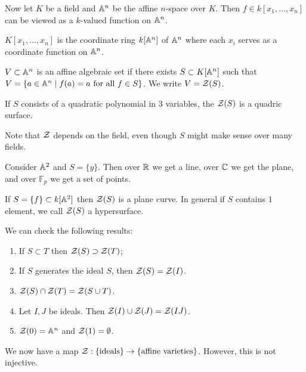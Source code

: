 \message{ !name(notes.tex)}\documentclass[10pt, twoside]{article}
\newcommand{\F}{\mathbb{F}}
\begin{document}
        Now let $K$ be a field and $\mathbb{A}^n$ be the affine $n$-space over $K$. Then $f \in k[x_1, \ldots, x_n]$ can be viewed as a $k$-valued function on $\mathbb{A}^n$.
        \begin{defn}
            $K[x_1, \ldots, x_n]$ is the coordinate ring $k[\mathbb{A}^n]$ of $\mathbb{A}^n$ where each $x_i$ serves as a coordinate function on $\mathbb{A}^n$.
        \end{defn}

        \begin{defn}
            $V \subset \mathbb{A}^n$ is an affine algebraic set if there exists $S \subset K[\mathbb{A}^n]$ such that $V = \{a \in \mathbb{A}^n \mid f(a) = a \text{ for all } f \in S \}$. We write $V = \mathcal{Z}(S)$.
        \end{defn}

        \begin{exm}
            If $S$ consists of a quadratic polynomial in $3$ variables, the $\mathcal{Z}(S)$ is a quadric surface.
        \end{exm}

        Note that $\mathcal{Z}$ depends on the field, even though $S$ might make sense over many fields.
        \begin{exm}
            Consider $\mathbb{A}^2$ and $S = \{y\}$. Then over $\mathbb{R}$ we get a line, over $\mathbb{C}$ we get the plane, and over $\F_p$ we get a set of points.
        \end{exm}

        \begin{exm}
            If $S = \{f\} \subset k[\mathbb{A}^2]$ then $\mathcal{Z}(S)$ is a plane curve. In general if $S$ contains $1$ element, we call $\mathcal{Z}(S)$ a hypersurface.
        \end{exm}

        We can check the following results:
        \begin{enumerate}
            \item If $S \subset T$ then $\mathcal{Z}(S) \supset \mathcal{Z}(T)$;
            \item If $S$ generates the ideal $S$, then $\mathcal{Z}(S) = \mathcal{Z}(I)$.
            \item $\mathcal{Z}(S) \cap \mathcal{Z}(T) = \mathcal{Z}(S \cup T)$.
            \item Let $I,J$ be ideals. Then $\mathcal{Z}(I) \cup \mathcal{Z}(J) = \mathcal{Z}(IJ)$.
            \item $\mathcal{Z}(0) = \mathbb{A}^n$ and $\mathcal{Z}(1) = \emptyset$.
        \end{enumerate}

        We now have a map $\mathcal{Z}: \{\text{ideals}\} \to \{\text{affine varieties}\}$. However, this is not injective.
\end{document}
